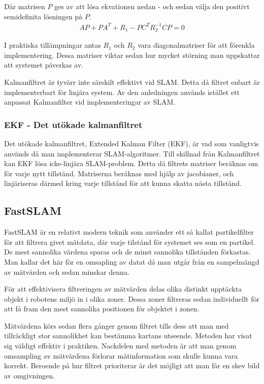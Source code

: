 \documentclass[a4paper,12pt,fleqn]{article}
\begin{document}
Där matrisen $P$ ges av att lösa ekvationen nedan - och sedan välja den positivt semidefinita lösningen på $P$. 
\begin{gather}
AP + PA^{T} + R_{1} - PC^{T}R_{2}^{-1}CP = 0
\end{gather}

I praktiska tillämpningar antas $R_{1}$ och $R_{2}$ vara diagonalmatriser för att förenkla implementering. Dessa matriser viktar sedan hur mycket störning man uppskattar att systemet påverkas av. 

Kalmanfiltret är tyvärr inte särskilt effektivt vid SLAM. Detta då filtret enbart är implementerbart för linjära system. Av den anledningen används istället ett anpassat Kalmanfilter vid implementeringar av SLAM.  

\subsubsection{EKF - Det utökade kalmanfiltret}

Det utökade kalmanfiltret, Extended Kalman Filter (EKF), är vad som vanligtvis används då man implementerar SLAM-algoritmer. Till skillnad från Kalmanfiltret kan EKF lösa icke-linjära SLAM-problem. Detta då filtrets matriser beräknas om för varje nytt tillstånd. Matriserna beräknas med hjälp av jacobianer, och linjäriseras därmed kring varje tillstånd för att kunna skatta nästa tillstånd. 

\subsection{FastSLAM}
FastSLAM är en relativt modern teknik som använder ett så kallat partikelfilter för att filtrera givet mätdata, där varje tilstånd för systemet ses som en partikel. De mest sannolika värdena sparas och de minst sannolika tillstånden förkastas. Man kallar det här för en omsapling av datat då man utgår från en sampelmängd av mätvärden och sedan minskar denna. 

För att effektivisera filtreringen av mätvärden delas olika distinkt upptäckta objekt i robotens miljö in i olika zoner. Dessa zoner filtreras sedan individuellt för att få fram den mest sannolika positionen för objektet i zonen. 

Mätvärdena körs sedan flera gånger genom filtret tills dess att man med tillräckligt stor sannolikhet kan bestämma kartans utseende. Metoden har visat sig väldigt effektiv i praktiken. Nackdelen med metoden är att man genom omsampling av mätvärdena förlorar mätinformation som skulle kunna vara korrekt. Beroende på hur filtret prioriterar är det möjligt att man får en skev bild av omgivningen.
\end{document}
